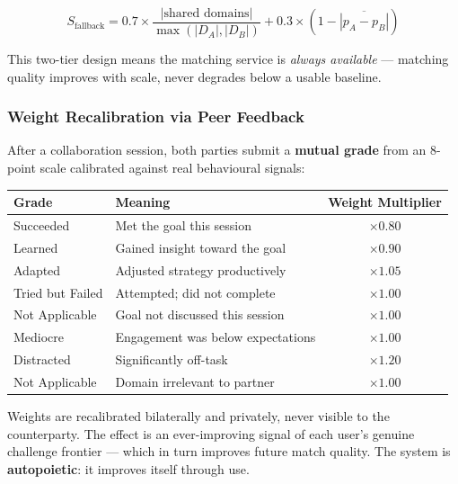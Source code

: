 \documentclass[11pt,a4paper]{article}
\begin{document}
\begin{equation}
S_{\mathrm{fallback}} = 0.7 \times \frac{|\text{shared domains}|}{\max(|D_A|, |D_B|)} + 0.3 \times \left(1 - \overline{|p_A - p_B|}\right)
\end{equation}

This two-tier design means the matching service is \textit{always available} — matching quality improves with scale, never degrades below a usable baseline.

\subsubsection{Weight Recalibration via Peer Feedback}

After a collaboration session, both parties submit a \textbf{mutual grade} from an 8-point scale calibrated against real behavioural signals:

\begin{center}
\begin{tabular}{llc}
\toprule
\textbf{Grade} & \textbf{Meaning} & \textbf{Weight Multiplier} \\
\midrule
Succeeded & Met the goal this session & $\times 0.80$ \\
Learned & Gained insight toward the goal & $\times 0.90$ \\
Adapted & Adjusted strategy productively & $\times 1.05$ \\
Tried but Failed & Attempted; did not complete & $\times 1.00$ \\
Not Applicable & Goal not discussed this session & $\times 1.00$ \\
Mediocre & Engagement was below expectations & $\times 1.00$ \\
Distracted & Significantly off-task & $\times 1.20$ \\
Not Applicable & Domain irrelevant to partner & $\times 1.00$ \\
\bottomrule
\end{tabular}
\end{center}

Weights are recalibrated bilaterally and privately, never visible to the counterparty. The effect is an ever-improving signal of each user's genuine challenge frontier — which in turn improves future match quality. The system is \textbf{autopoietic}: it improves itself through use.
\end{document}
